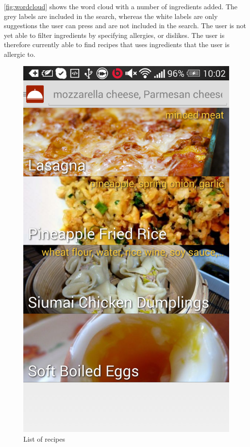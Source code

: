 \autoref{fig:wordcloud} shows the word cloud with a number of ingredients added. The grey labels are included in the search, whereas the white labels are only suggestions the user can press and are not included in the search. The user is not yet able to filter ingredients by specifying allergies, or dislikes. The user is therefore currently able to find recipes that uses ingredients that the user is allergic to. 

\begin{figure}[H]
\begin{minipage}[t]{0.5\columnwidth}
\centering
\includegraphics[width=0.7\columnwidth]{img/screenshots/finallist.png}
\caption{List of recipes\label{fig:recipelist}}
\end{minipage}
\hspace{0.5cm}
\begin{minipage}[t]{0.5\columnwidth}
\centering

\end{minipage}
\end{figure}
